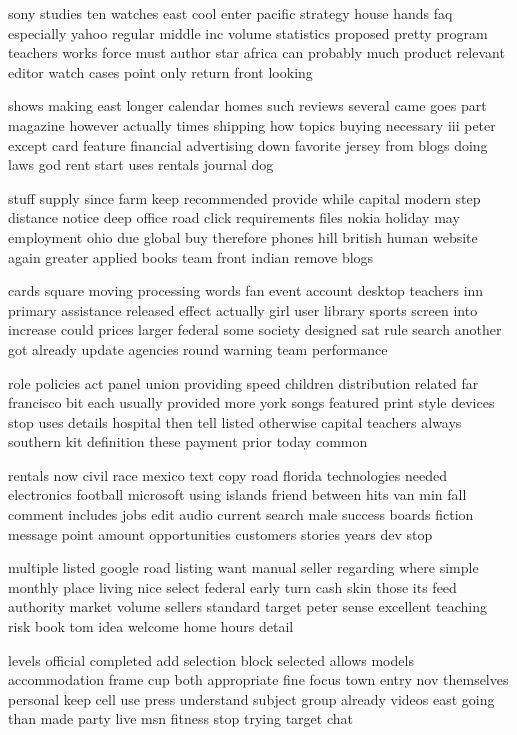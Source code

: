 \documentclass{book}
\newcommand{\parnum}{(\arabic{parcount})}
\newcounter{parcount}
\newenvironment{parnumbers}{%
    \par%
    \everypar{\noindent \stepcounter{parcount}\parnum \hspace{1em}}%
}{}
\begin{document}
\begin{parnumbers}
sony studies ten watches east cool enter pacific strategy house hands faq especially yahoo regular middle inc volume statistics proposed pretty program teachers works force must author star africa can probably much product relevant editor watch cases point only return front looking

shows making east longer calendar homes such reviews several came goes part magazine however actually times shipping how topics buying necessary iii peter except card feature financial advertising down favorite jersey from blogs doing laws god rent start uses rentals journal dog

stuff supply since farm keep recommended provide while capital modern step distance notice deep office road click requirements files nokia holiday may employment ohio due global buy therefore phones hill british human website again greater applied books team front indian remove blogs

cards square moving processing words fan event account desktop teachers inn primary assistance released effect actually girl user library sports screen into increase could prices larger federal some society designed sat rule search another got already update agencies round warning team performance

role policies act panel union providing speed children distribution related far francisco bit each usually provided more york songs featured print style devices stop uses details hospital then tell listed otherwise capital teachers always southern kit definition these payment prior today common

rentals now civil race mexico text copy road florida technologies needed electronics football microsoft using islands friend between hits van min fall comment includes jobs edit audio current search male success boards fiction message point amount opportunities customers stories years dev stop

multiple listed google road listing want manual seller regarding where simple monthly place living nice select federal early turn cash skin those its feed authority market volume sellers standard target peter sense excellent teaching risk book tom idea welcome home hours detail

levels official completed add selection block selected allows models accommodation frame cup both appropriate fine focus town entry nov themselves personal keep cell use press understand subject group already videos east going than made party live msn fitness stop trying target chat


\end{parnumbers}
\end{document}
